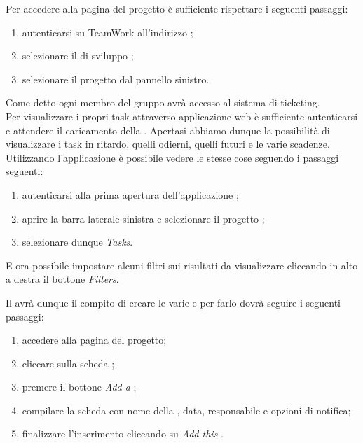  \label{sec:teamwork}
			Per accedere alla pagina del progetto è sufficiente rispettare i seguenti passaggi:
			\begin{enumerate}
				\item autenticarsi su TeamWork all'indirizzo ;
				\item selezionare il  di sviluppo \groupname{};
				\item selezionare il progetto \projectname{} dal pannello sinistro.
			\end{enumerate}
			
			Come detto ogni membro del gruppo \groupname{} avrà accesso al sistema di ticketing.\\
			Per visualizzare i propri task attraverso applicazione web è sufficiente autenticarsi e attendere il caricamento della . Apertasi abbiamo dunque la possibilità di visualizzare i task in ritardo, quelli odierni, quelli futuri e le varie scadenze.\\
			
Utilizzando l'applicazione  è possibile vedere le stesse cose seguendo i passaggi seguenti:
			\begin{enumerate}
				\item autenticarsi alla prima apertura dell'applicazione ;
				\item aprire la barra laterale sinistra e selezionare il progetto \projectname{};
				\item selezionare dunque \textit{Tasks}.
			\end{enumerate}
			E ora possibile impostare alcuni filtri sui risultati da visualizzare cliccando in alto a destra il bottone  \textit{Filters}.

			Il  avrà dunque il compito di creare le varie  e per farlo dovrà seguire i seguenti passaggi:
			\begin{enumerate}
				\item accedere alla pagina del progetto;
				\item cliccare sulla scheda \textit{};
				\item premere il bottone \textit{Add a };
				\item compilare la scheda con nome della , data, responsabile e opzioni di notifica;
				\item finalizzare l'inserimento cliccando su \textit{Add this }.
			\end{enumerate}
			
